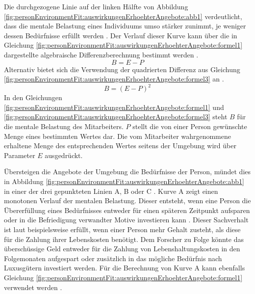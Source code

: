 Die durchgezogene Linie auf der linken Hälfte von Abbildung \ref{fig:personEnvironmentFit:auswirkungenErhoehterAngebote:abb1} verdeutlicht, dass die mentale Belastung eines Individuums umso stärker zunimmt, je weniger dessen Bedürfnisse erfüllt werden \cite[S. 30]{mechanismsOfJobStressAndStrain:1982}. Der Verlauf dieser Kurve kann über die in Gleichung \ref{fig:personEnvironmentFit:auswirkungenErhoehterAngebote:formel1} dargestellte algebraische Differenzberechnung bestimmt werden \cite[S. 2]{edwards:1993}.
\begin{equation}
	B = E - P
	\label{fig:personEnvironmentFit:auswirkungenErhoehterAngebote:formel1}
\end{equation}
Alternativ bietet sich die Verwendung der quadrierten Differenz aus Gleichung \ref{fig:personEnvironmentFit:auswirkungenErhoehterAngebote:formel3} an \cite[S. 2]{edwards:1993}.
\begin{equation}
	B = (E - P)^2
	\label{fig:personEnvironmentFit:auswirkungenErhoehterAngebote:formel3}
\end{equation}
In den Gleichungen \ref{fig:personEnvironmentFit:auswirkungenErhoehterAngebote:formel1} und \ref{fig:personEnvironmentFit:auswirkungenErhoehterAngebote:formel3} steht $B$ für die mentale Belastung des Mitarbeiters. $P$ stellt die von einer Person gewünschte Menge eines bestimmten Wertes dar. Die vom Mitarbeiter wahrgenommene erhaltene Menge des entsprechenden Wertes seitens der Umgebung wird über Parameter $E$ ausgedrückt. \cite[S. 1f.]{edwards:1993}\cite[S. 2ff.]{copingAndAdaption:1974}

Übersteigen die Angebote der Umgebung die Bedürfnisse der Person, mündet dies in Abbildung \ref{fig:personEnvironmentFit:auswirkungenErhoehterAngebote:abb1} in einer der drei gepunkteten Linien A, B oder C \cite[S. 29ff.]{mechanismsOfJobStressAndStrain:1982}. Kurve A zeigt einen monotonen Verlauf der mentalen Belastung. Dieser entsteht, wenn eine Person die Übererfüllung eines Bedürfnisses entweder für einen späteren Zeitpunkt aufsparen oder in die Befriedigung verwandter Motive investieren kann \cite[S. 21]{edwards:2008}\cite[S. 30]{mechanismsOfJobStressAndStrain:1982}\cite[S. 11]{harrison:1978}. Dieser Sachverhalt ist laut \textcite[S. 21]{edwards:2008} beispielsweise erfüllt, wenn einer Person mehr Gehalt zusteht, als diese für die Zahlung ihrer Lebenskosten benötigt. Dem Forscher zu Folge könnte das überschüssige Geld entweder für die Zahlung von Lebenshaltungskosten in den Folgemonaten aufgespart oder zusätzlich in das mögliche Bedürfnis nach Luxusgütern investiert werden. Für die Berechnung von Kurve A kann ebenfalls Gleichung \ref{fig:personEnvironmentFit:auswirkungenErhoehterAngebote:formel1} verwendet werden \cite[S. 2]{edwards:1993}.


